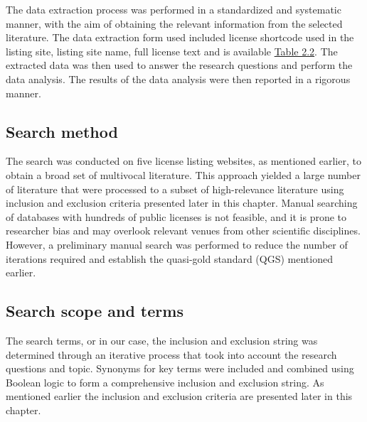 The data extraction process was performed in a standardized and systematic manner, with the aim of obtaining the relevant information from the selected literature. The data extraction form used included license shortcode used in the listing site, listing site name, full license text and is available  \hyperref[table:extraction]{Table 2.2}. The extracted data was then used to answer the research questions and perform the data analysis. The results of the data analysis were then reported in a rigorous manner.

\subsection{Search method}
The search was conducted on five license listing websites, as mentioned earlier, to obtain a broad set of multivocal literature. This approach yielded a large number of literature that were processed to a subset of high-relevance literature using inclusion and exclusion criteria presented later in this chapter. Manual searching of databases with hundreds of public licenses is not feasible, and it is prone to researcher bias and may overlook relevant venues from other scientific disciplines. However, a preliminary manual search was performed to reduce the number of iterations required and establish the quasi-gold standard (QGS) mentioned earlier.

\subsection{Search scope and terms}
The search terms, or in our case, the inclusion and exclusion string was determined through an iterative process that took into account the research questions and topic. Synonyms for key terms were included and combined using Boolean logic to form a comprehensive inclusion and exclusion string. As mentioned earlier the inclusion and exclusion criteria are presented later in this chapter.

